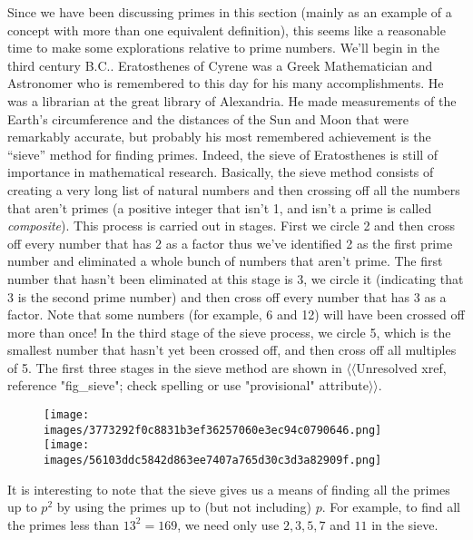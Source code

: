 \documentclass[10pt,]{book}
\theoremstyle{plain}
\theoremstyle{definition}
\theoremstyle{definition}
\numberwithin{equation}{section}
\begin{document}
    Since we have been discussing primes in this section (mainly
    as an example of a concept with more than one equivalent
    definition), this seems like a reasonable time to make some
    explorations relative to prime numbers. We'll begin in the
    third century B.C.. 
    Eratosthenes of Cyrene was a Greek Mathematician and
    Astronomer who is remembered to this day for his many accomplishments.
    He was a librarian at the great library of Alexandria. He made
    measurements of the Earth's circumference and the distances of
    the Sun and Moon that were remarkably accurate, but probably his
    most remembered achievement is the ``sieve'' method for finding
    primes. Indeed, the sieve of Eratosthenes
    is still of importance
    in mathematical research. Basically, the sieve method consists
    of creating a very long list of natural numbers and then crossing
    off all the numbers that aren't primes (a positive integer that
    isn't 1, and isn't a prime is called \emph{ composite}).
    This process
    is carried out in stages. First we circle 2 and then cross off
    every number that has 2 as a factor \textemdash{} thus we've identified
    2 as the first prime number and eliminated a whole bunch of numbers
    that aren't prime. The first number that hasn't been eliminated at
    this stage is 3, we circle it (indicating that 3 is the second prime
    number) and then cross off every number that has 3 as a factor. Note
    that some numbers (for example, 6 and 12) will have been crossed off
    more than once! In the third stage of the sieve process, we circle
    5, which is the smallest number that hasn't yet been crossed off, and
    then cross off all multiples of 5. The first three stages in the
    sieve method are shown in {$\langle\langle$Unresolved xref, reference "fig\_sieve"; check spelling or use "provisional" attribute$\rangle\rangle$}.
\leavevmode%
\begin{figure}
\centering
\texttt{[image: images/3773292f0c8831b3ef36257060e3ec94c0790646.png]}
\texttt{[image: images/56103ddc5842d863ee7407a765d30c3d3a82909f.png]}
\end{figure}
\par

    It is interesting to note that the sieve gives us a means of finding
    all the primes up to \(p^2\) by using the primes up to (but not
    including) \(p\). For
    example, to find all the primes less than \(13^2 = 169\), we need only
    use \(2, 3, 5, 7\) and \(11\) in the sieve.
\par
\end{document}
